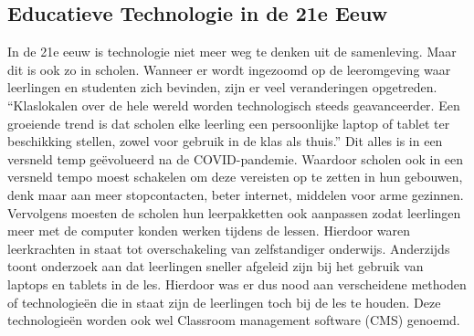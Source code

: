 \subsection{Educatieve Technologie in de 21e Eeuw}
In de 21e eeuw is technologie niet meer weg te denken uit de samenleving. Maar dit is ook zo in scholen. Wanneer er wordt ingezoomd op de leeromgeving waar leerlingen en studenten zich bevinden, zijn er veel veranderingen opgetreden. ``Klaslokalen over de hele wereld worden technologisch steeds geavanceerder. Een groeiende trend is dat scholen elke leerling een persoonlijke laptop of tablet ter beschikking stellen, zowel voor gebruik in de klas als thuis.'' \textcite{HALL2021101957} Dit alles is in een versneld temp geëvolueerd na de COVID-pandemie. Waardoor scholen ook in een versneld tempo moest schakelen om deze vereisten op te zetten in hun gebouwen, denk maar aan meer stopcontacten, beter internet, middelen voor arme gezinnen.\newline
Vervolgens moesten de scholen hun leerpakketten ook aanpassen zodat leerlingen meer met de computer konden werken tijdens de lessen. Hierdoor waren leerkrachten in staat tot overschakeling van zelfstandiger onderwijs. Anderzijds toont onderzoek aan dat leerlingen sneller afgeleid zijn bij het gebruik van laptops en tablets in de les. \textcite{deng2020laptops} Hierdoor was er dus nood aan verscheidene methoden of technologieën die in staat zijn de leerlingen toch bij de les te houden. Deze technologieën worden ook wel Classroom management software (CMS) genoemd.

